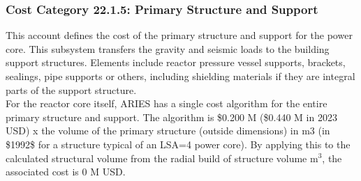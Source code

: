 \subsubsection*{Cost Category 22.1.5:  Primary Structure and Support}
\label{sec:22.1.5}
This account defines the cost of the primary structure and support for the power core. This subsystem  transfers the gravity and seismic loads to the building support structures. Elements include reactor pressure vessel supports, brackets, sealings, pipe supports or others, including shielding materials if they are integral parts of the support structure. \\

For the reactor core itself, ARIES has a single cost algorithm for the entire primary structure and support. The  algorithm is \$0.200 M (\$0.440 M in 2023 USD) x the  volume of the primary structure (outside dimensions) in m3 (in \$1992\$ for a structure typical of  an LSA=4 power core). By applying this to the calculated structural volume from the radial build of structure volume m$^{3}$, the associated cost is 0 M USD.